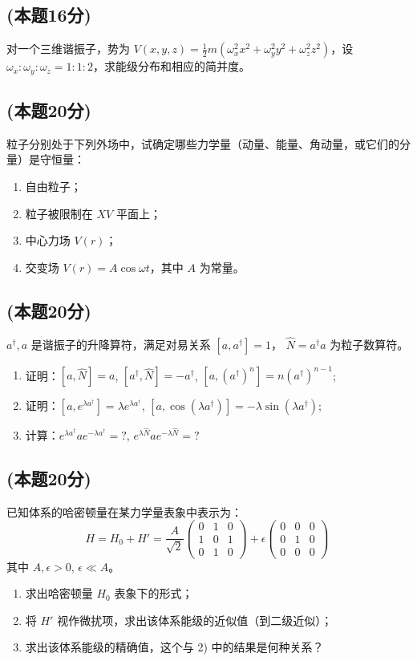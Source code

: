 \subsection{(本题16分)}
对一个三维谐振子，势为 $V(x, y, z) = \frac{1}{2}m \left( \omega_x^2 x^2 + \omega_y^2 y^2 + \omega_z^2 z^2 \right)$，设 $\omega_x : \omega_y : \omega_z = 1 : 1 : 2$，求能级分布和相应的简并度。
\subsection{(本题20分)}
粒子分别处于下列外场中，试确定哪些力学量（动量、能量、角动量，或它们的分量）是守恒量：
\begin{enumerate}
\item 自由粒子；
\item 粒子被限制在 $XV$ 平面上；
\item 中心力场 $V(r)$；
\item 交变场 $V(r) = A \cos \omega t$，其中 $A$ 为常量。
\end{enumerate}
\subsection{(本题20分)}
$a^{\dagger}, a$ 是谐振子的升降算符，满足对易关系 $[a, a^{\dagger}] = 1$， $\hat{N} = a^{\dagger}a$ 为粒子数算符。
\begin{enumerate}
\item 证明：$[a, \hat{N}] = a$, $[a^{\dagger}, \hat{N}] = -a^{\dagger}$, $[a, (a^{\dagger})^n] = n(a^{\dagger})^{n-1}$;
\item 证明：$[a, e^{\lambda a^{\dagger}}] = \lambda e^{\lambda a^{\dagger}}$, $[a, \cos(\lambda a^{\dagger})] = -\lambda \sin(\lambda a^{\dagger})$;
\item 计算：$e^{\lambda a^{\dagger}} a e^{-\lambda a^{\dagger}} = ?$, $e^{\lambda \hat{N}} a e^{-\lambda \hat{N}} = ?$
\end{enumerate}
\subsection{(本题20分)}
已知体系的哈密顿量在某力学量表象中表示为：
$$H = H_0 + H' = \frac{A}{\sqrt{2}}
\begin{pmatrix}
0 & 1 & 0 \\
1 & 0 & 1 \\
0 & 1 & 0
\end{pmatrix}
+ \epsilon
\begin{pmatrix}
0 & 0 & 0 \\
0 & 1 & 0 \\
0 & 0 & 0
\end{pmatrix}~$$
其中 $A, \epsilon > 0$, $\epsilon \ll A$。
\begin{enumerate}
\item 求出哈密顿量 $H_0$ 表象下的形式；
\item 将 $H'$ 视作微扰项，求出该体系能级的近似值（到二级近似）；
\item 求出该体系能级的精确值，这个与 2) 中的结果是何种关系？
\end{enumerate}
